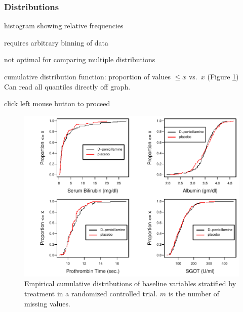 \subsubsection{Distributions}
\bi
\item histogram showing relative frequencies
 \bi
 \item requires arbitrary binning of data
 \item not optimal for comparing multiple distributions
 \ei
\item cumulative distribution function: proportion of values $\leq x$
  vs.\ $x$ (Figure \ref{fig:descript-ecdf}) \\
 Can read all quantiles directly off graph.
\begin{Schunk}
\begin{Soutput}
click left mouse button to proceed
\end{Soutput}
\begin{figure}[htbp]

\centerline{\includegraphics{descript-ecdf-1} }

\caption[Empirical cumulative distribution functions]{Empirical cumulative distributions of baseline variables  stratified by treatment in a randomized controlled trial. $m$ is the number of missing values.}\label{fig:descript-ecdf}
\end{figure}
\end{Schunk}

